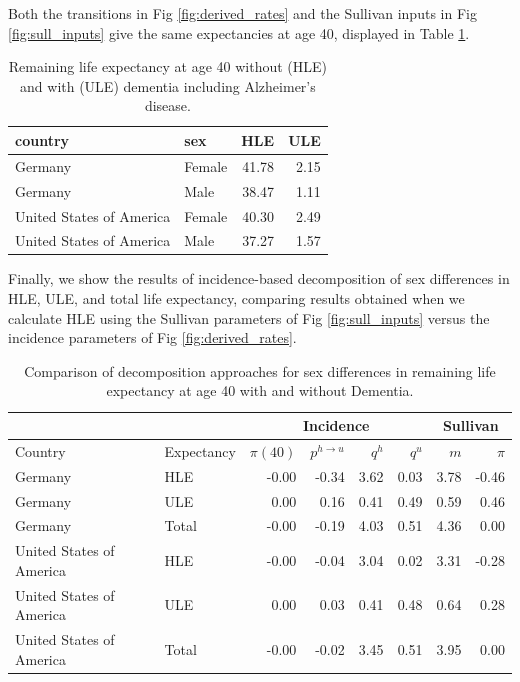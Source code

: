 \documentclass[sn-apa]{sn-jnl}%
\theoremstyle{thmstyleone}%
\theoremstyle{thmstyletwo}%
\theoremstyle{thmstylethree}%
\begin{document}
Both the transitions in Fig \ref{fig:derived_rates} and the Sullivan inputs in Fig \ref{fig:sull_inputs} give the same expectancies at age 40, displayed in Table \ref{tab:expect}.

\begin{table}[ht!]
\caption{Remaining life expectancy at age 40 without (HLE) and with (ULE) dementia including Alzheimer's disease.}
\label{tab:expect}
\centering
\begin{tabular}{llrr}
  \hline
 country & sex & HLE & ULE \\ 
  \hline
Germany & Female & 41.78 & 2.15 \\ 
Germany & Male & 38.47 & 1.11 \\ 
United States of America & Female & 40.30 & 2.49 \\ 
United States of America & Male & 37.27 & 1.57 \\ 
   \hline
\end{tabular}
\end{table}

Finally, we show the results of incidence-based decomposition of sex differences in HLE, ULE, and total life expectancy, comparing results obtained when we calculate HLE using the Sullivan parameters of Fig \ref{fig:sull_inputs} versus the incidence parameters of Fig \ref{fig:derived_rates}.

\begin{table}[ht!]
\label{tab:results}
\caption{Comparison of decomposition approaches for sex differences in remaining life expectancy at age 40 with and without Dementia. }
\centering
\begin{tabular}{ll|rrrr|rr}
  
  \multicolumn{2}{c}{} & \multicolumn{4}{c}{Incidence} & \multicolumn{2}{c}{Sullivan} \\
  \hline
 Country & Expectancy & $\pi(40)$ & $p^{h\rightarrow u}$ & $q^h$ & $q^u$ & $m$ & $\pi$ \\ 
  \hline
Germany & HLE & -0.00 & -0.34 & 3.62 & 0.03 & 3.78 & -0.46 \\ 
Germany & ULE & 0.00 & 0.16 & 0.41 & 0.49 & 0.59 & 0.46 \\ 
Germany & Total & -0.00 & -0.19 & 4.03 & 0.51 & 4.36 & 0.00 \\ 
  \hline
United States of America & HLE & -0.00 & -0.04 & 3.04 & 0.02 & 3.31 & -0.28 \\ 
United States of America & ULE & 0.00 & 0.03 & 0.41 & 0.48 & 0.64 & 0.28 \\ 
United States of America & Total & -0.00 & -0.02 & 3.45 & 0.51 & 3.95 & 0.00 \\ 
   \hline
\end{tabular}
\end{table}
\end{document}
